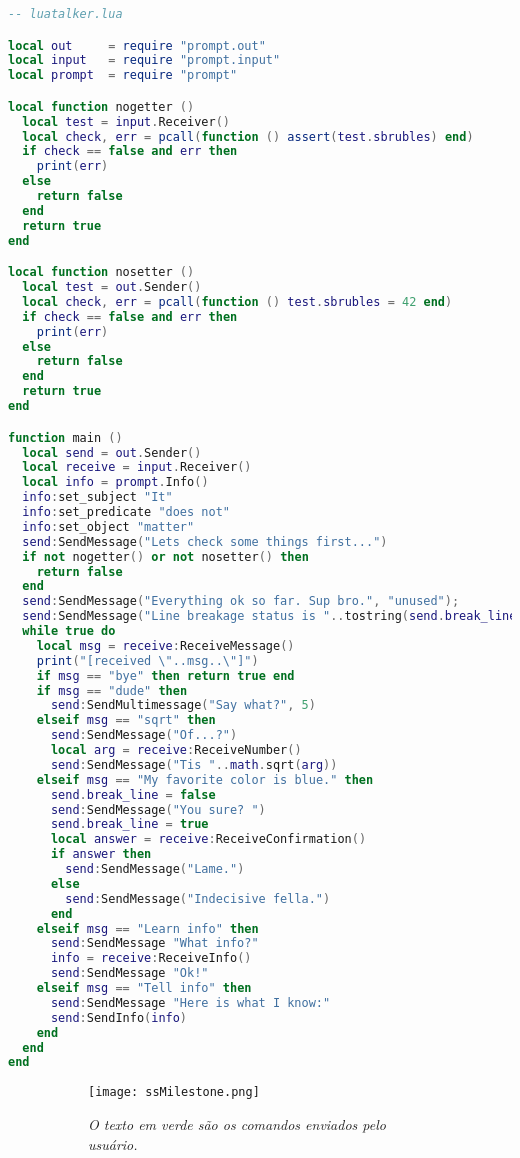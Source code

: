 \vspace{1em}

\begin{lstlisting}[language=lua]
-- luatalker.lua

local out     = require "prompt.out"
local input   = require "prompt.input"
local prompt  = require "prompt"

local function nogetter ()
  local test = input.Receiver()
  local check, err = pcall(function () assert(test.sbrubles) end)
  if check == false and err then
    print(err)
  else
    return false
  end
  return true
end

local function nosetter ()
  local test = out.Sender()
  local check, err = pcall(function () test.sbrubles = 42 end)
  if check == false and err then
    print(err)
  else
    return false
  end
  return true
end

function main ()
  local send = out.Sender()
  local receive = input.Receiver()
  local info = prompt.Info()
  info:set_subject "It"
  info:set_predicate "does not"
  info:set_object "matter"
  send:SendMessage("Lets check some things first...")
  if not nogetter() or not nosetter() then
    return false
  end
  send:SendMessage("Everything ok so far. Sup bro.", "unused");
  send:SendMessage("Line breakage status is "..tostring(send.break_line), "unused");
  while true do
    local msg = receive:ReceiveMessage()
    print("[received \"..msg..\"]")
    if msg == "bye" then return true end
    if msg == "dude" then
      send:SendMultimessage("Say what?", 5)
    elseif msg == "sqrt" then
      send:SendMessage("Of...?")
      local arg = receive:ReceiveNumber()
      send:SendMessage("Tis "..math.sqrt(arg))
    elseif msg == "My favorite color is blue." then
      send.break_line = false
      send:SendMessage("You sure? ")
      send.break_line = true
      local answer = receive:ReceiveConfirmation()
      if answer then
        send:SendMessage("Lame.")
      else
        send:SendMessage("Indecisive fella.")
      end
    elseif msg == "Learn info" then
      send:SendMessage "What info?"
      info = receive:ReceiveInfo()
      send:SendMessage "Ok!"
    elseif msg == "Tell info" then
      send:SendMessage "Here is what I know:"
      send:SendInfo(info)
    end
  end
end
\end{lstlisting}

\vspace{1em}

\begin{figure}[ht]
  \centering
  \caption{}
  \begin{subfigure}{.8\textwidth}
    \begin{center}
      \texttt{[image: ssMilestone.png]}
      \vspace{1em}

      \textit{
        O texto em verde são os comandos enviados pelo usuário.
      }
    \end{center}
  \end{subfigure}
  \label{fig:milestone}
\end{figure}


